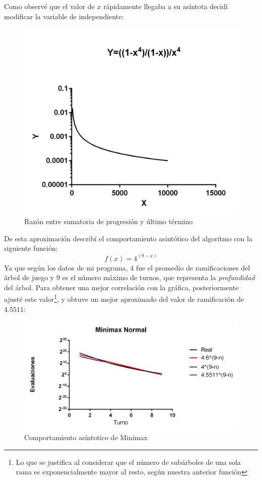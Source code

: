 Como observé que el valor de $x$ rápidamente llegaba a su asíntota decidí modificar la variable de independiente: 
\begin{figure}[H]
\centering
\includegraphics[scale=.60]{Graphs/Funciones2.png}
\caption{Razón entre sumatoria de progresión y último término}\label{graf1}
\end{figure}

De esta aproximación describí el comportamiento asintótico del algoritmo con la siguiente función:
\begin{equation}
f(x) = 4^{(9-x)}
\end{equation}
Ya que según los datos de mi programa, $4$ fue el promedio de ramificaciones del árbol de juego y 9 es el número máximo de turnos, que representa la \emph{profundidad} del árbol. Para obtener una mejor correlación con la gráfica, posteriormente ajusté este valor\footnote{Lo que se justifica al considerar que el número de subárboles de una sola rama es exponencialmente mayor al resto, según nuestra anterior función}, y obtuve un mejor aproximado del valor de ramificación de $4.5511$: 
\begin{figure}[H]
\centering
\includegraphics[scale=.60]{Graphs/Minis_Exposimples.png}
\caption{Comportamiento asíntotico de Minimax}\label{graf2}
\end{figure}

